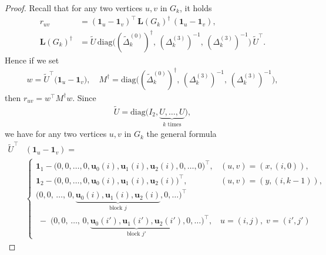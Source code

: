 \documentclass[11pt,a4paper]{amsart}
\begin{document}
\begin{proof}
    Recall that for any two vertices $u,v$ in $G_k$, it holds
        \begin{align*}
            r_{uv}
            &=(\mathbf{1}_u-\mathbf{1}_v)^\top\,\mathbf{L}(G_k)^\dagger\,(\mathbf{1}_u-\mathbf{1}_v),\\
            \mathbf{L}(G_k)^\dagger
            &=\widetilde U\,
            \mathrm{diag}\bigl((\widetilde\Delta_k^{(0)})^\dagger,\,
                           (\Delta_k^{(3)})^{-1},\,
                           (\Delta_k^{(3)})^{-1}\bigr)\,
            \widetilde U^\top.
        \end{align*}
    Hence if we set
        \begin{align*}
            w=\widetilde U^\top\bigl(\mathbf{1}_u-\mathbf{1}_v\bigr),
            \quad
            M^\dagger=\mathrm{diag}\bigl((\widetilde\Delta_k^{(0)})^\dagger,\,
                                      (\Delta_k^{(3)})^{-1},\,
                                      (\Delta_k^{(3)})^{-1}\bigr),
        \end{align*}
    then $r_{uv}=w^\top M^\dagger w$. Since
        \begin{align*}
            \widetilde{U}=\mathrm{diag}\bigl(I_2,\underbrace{U,\dots,U}_{k\text{ times}}\bigr),
        \end{align*}
    we have for any two vertices $u,v$ in $G_k$ the general formula
        \begin{align*}
            \widetilde U^\top&(\mathbf{1}_u-\mathbf{1}_v)=\\
            &\begin{cases}
              \displaystyle
              \mathbf{1}_1 - \bigl(0,0,\dots,0,\mathbf{u}_0(i),\mathbf{u}_1(i),\mathbf{u}_2(i),0,\dots,0\bigr)^\top,
              & (u,v)=(x,(i,0)),\\[1em]
              \displaystyle
              \mathbf{1}_2 - \bigl(0,0,\dots,0,\mathbf{u}_0(i),\mathbf{u}_1(i),\mathbf{u}_2(i)\bigr)^\top,
              & (u,v)=(y,(i,k-1)),\\[1em]
              \displaystyle
              \bigl(0,0,\,\dots,\,0,\underbrace{\mathbf{u}_0(i),\mathbf{u}_1(i),\mathbf{u}_2(i)}_{\text{block }j},0,\dots\bigr)^\top\\
              \;-\;
              \bigl(0,0,\,\dots,\,0,\underbrace{\mathbf{u}_0(i'),\mathbf{u}_1(i'),\mathbf{u}_2(i')}_{\text{block }j'},0,\dots\bigr)^\top,
              & u=(i,j),\;v=(i',j')
            \end{cases}
        \end{align*}

\end{proof}
\end{document}
